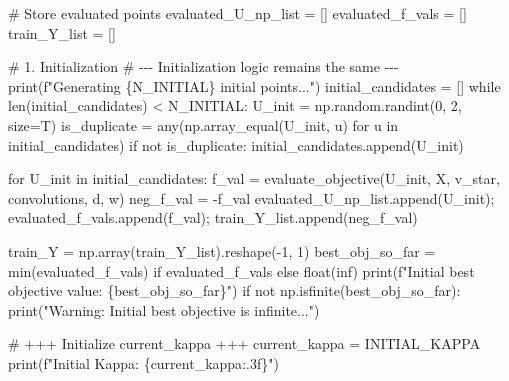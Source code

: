 \documentclass[
  letterpaper,
  DIV=11,
  numbers=noendperiod]{scrartcl}
\newenvironment{Shaded}{\begin{snugshade}}{\end{snugshade}}
\newcommand{\BuiltInTok}[1]{\textcolor[rgb]{0.00,0.23,0.31}{#1}}
\newcommand{\CommentTok}[1]{\textcolor[rgb]{0.37,0.37,0.37}{#1}}
\newcommand{\ControlFlowTok}[1]{\textcolor[rgb]{0.00,0.23,0.31}{#1}}
\newcommand{\DecValTok}[1]{\textcolor[rgb]{0.68,0.00,0.00}{#1}}
\newcommand{\KeywordTok}[1]{\textcolor[rgb]{0.00,0.23,0.31}{#1}}
\newcommand{\NormalTok}[1]{\textcolor[rgb]{0.00,0.23,0.31}{#1}}
\newcommand{\OperatorTok}[1]{\textcolor[rgb]{0.37,0.37,0.37}{#1}}
\newcommand{\SpecialCharTok}[1]{\textcolor[rgb]{0.37,0.37,0.37}{#1}}
\newcommand{\SpecialStringTok}[1]{\textcolor[rgb]{0.13,0.47,0.30}{#1}}
\newcommand{\StringTok}[1]{\textcolor[rgb]{0.13,0.47,0.30}{#1}}
\begin{document}
\begin{Shaded}
\begin{Highlighting}[]
\CommentTok{\# Store evaluated points}
\NormalTok{evaluated\_U\_np\_list }\OperatorTok{=}\NormalTok{ []}
\NormalTok{evaluated\_f\_vals }\OperatorTok{=}\NormalTok{ []}
\NormalTok{train\_Y\_list }\OperatorTok{=}\NormalTok{ []}

\CommentTok{\# 1. Initialization}
\CommentTok{\# {-}{-}{-} Initialization logic remains the same {-}{-}{-}}
\BuiltInTok{print}\NormalTok{(}\SpecialStringTok{f"Generating }\SpecialCharTok{\{}\NormalTok{N\_INITIAL}\SpecialCharTok{\}}\SpecialStringTok{ initial points..."}\NormalTok{)}
\NormalTok{initial\_candidates }\OperatorTok{=}\NormalTok{ []}
\ControlFlowTok{while} \BuiltInTok{len}\NormalTok{(initial\_candidates) }\OperatorTok{\textless{}}\NormalTok{ N\_INITIAL:}
\NormalTok{    U\_init }\OperatorTok{=}\NormalTok{ np.random.randint(}\DecValTok{0}\NormalTok{, }\DecValTok{2}\NormalTok{, size}\OperatorTok{=}\NormalTok{T)}
\NormalTok{    is\_duplicate }\OperatorTok{=} \BuiltInTok{any}\NormalTok{(np.array\_equal(U\_init, u) }\ControlFlowTok{for}\NormalTok{ u }\KeywordTok{in}\NormalTok{ initial\_candidates)}
    \ControlFlowTok{if} \KeywordTok{not}\NormalTok{ is\_duplicate: initial\_candidates.append(U\_init)}

\ControlFlowTok{for}\NormalTok{ U\_init }\KeywordTok{in}\NormalTok{ initial\_candidates:}
\NormalTok{    f\_val }\OperatorTok{=}\NormalTok{ evaluate\_objective(U\_init, X, v\_star, convolutions, d, w)}
\NormalTok{    neg\_f\_val }\OperatorTok{=} \OperatorTok{{-}}\NormalTok{f\_val}
\NormalTok{    evaluated\_U\_np\_list.append(U\_init)}\OperatorTok{;}\NormalTok{ evaluated\_f\_vals.append(f\_val)}\OperatorTok{;}\NormalTok{ train\_Y\_list.append(neg\_f\_val)}

\NormalTok{train\_Y }\OperatorTok{=}\NormalTok{ np.array(train\_Y\_list).reshape(}\OperatorTok{{-}}\DecValTok{1}\NormalTok{, }\DecValTok{1}\NormalTok{)}
\NormalTok{best\_obj\_so\_far }\OperatorTok{=} \BuiltInTok{min}\NormalTok{(evaluated\_f\_vals) }\ControlFlowTok{if}\NormalTok{ evaluated\_f\_vals }\ControlFlowTok{else} \BuiltInTok{float}\NormalTok{(}\StringTok{\textquotesingle{}inf\textquotesingle{}}\NormalTok{)}
\BuiltInTok{print}\NormalTok{(}\SpecialStringTok{f"Initial best objective value: }\SpecialCharTok{\{}\NormalTok{best\_obj\_so\_far}\SpecialCharTok{\}}\SpecialStringTok{"}\NormalTok{)}
\ControlFlowTok{if} \KeywordTok{not}\NormalTok{ np.isfinite(best\_obj\_so\_far): }\BuiltInTok{print}\NormalTok{(}\StringTok{"Warning: Initial best objective is infinite..."}\NormalTok{)}

\CommentTok{\# +++ Initialize current\_kappa +++}
\NormalTok{current\_kappa }\OperatorTok{=}\NormalTok{ INITIAL\_KAPPA}
\BuiltInTok{print}\NormalTok{(}\SpecialStringTok{f"Initial Kappa: }\SpecialCharTok{\{}\NormalTok{current\_kappa}\SpecialCharTok{:.3f\}}\SpecialStringTok{"}\NormalTok{)}



\end{Highlighting}
\end{Shaded}
\end{document}
